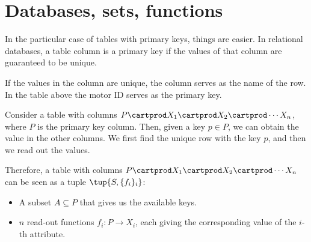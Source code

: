 
\section{Databases, sets, functions}

%
%
%


In the particular case of tables with primary keys, things are easier.
In relational databases, a table column is a primary key if the values of that column are guaranteed to be unique.

If the values in the column are unique, the column serves as the name of the row.
In the table above the motor ID serves as the primary key.

Consider a table with columns $P \cartprod X_1 \cartprod X_2 \cartprod \cdots X_n$, where $P$ is the primary key column.
Then, given a key $p \in P$, we can obtain the value in the other columns.
We first find the unique row with the key $p$, and then we read out the values.

Therefore, a table with columns $P \cartprod X_1 \cartprod X_2 \cartprod \cdots X_n$ can be seen as a tuple $\tup{S, \{f_i\}_i}$:
\begin{itemize}
	\item A subset $A \subseteq P$ that gives us the available keys.
	\item $n$ read-out functions $f_i\colon P \to X_i$, each giving the corresponding value of the $i$-th attribute.
\end{itemize}

